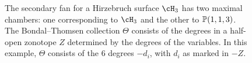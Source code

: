 \documentclass{amsart}
\begin{document}
\begin{figure}
\caption{The secondary fan for a Hirzebruch surface $\cH_3$ has two maximal
chambers: one corresponding to $\cH_3$ and the other to $\mathbb P(1,1,3)$.  The
Bondal--Thomsen collection $\Theta$ consists of the degrees in a half-open
zonotope $Z$ determined by the degrees of the variables.   In this
example, $\Theta$ consists of the $6$ degrees $-d_i$, with $d_i$ as marked in
$-Z$.}
\label{fig:HirzSecondaryFan}
\end{figure}
\end{document}
